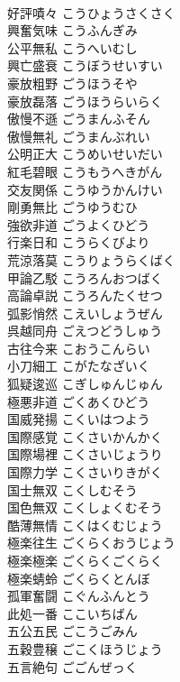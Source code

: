 \documentclass[8pt]{extreport}
\begin{document}
\begin{CJK}{UTF8}{min}
\\	好評嘖々	こうひょうさくさく	
\\	興奮気味	こうふんぎみ	
\\	公平無私	こうへいむし	
\\	興亡盛衰	こうぼうせいすい	
\\	豪放粗野	ごうほうそや	
\\	豪放磊落	ごうほうらいらく	
\\	傲慢不遜	ごうまんふそん	
\\	傲慢無礼	ごうまんぶれい	
\\	公明正大	こうめいせいだい	
\\	紅毛碧眼	こうもうへきがん	
\\	交友関係	こうゆうかんけい	
\\	剛勇無比	ごうゆうむひ	
\\	強欲非道	ごうよくひどう	
\\	行楽日和	こうらくびより	
\\	荒涼落莫	こうりょうらくばく	
\\	甲論乙駁	こうろんおつばく	
\\	高論卓説	こうろんたくせつ	
\\	弧影悄然	こえいしょうぜん	
\\	呉越同舟	ごえつどうしゅう	
\\	古往今来	こおうこんらい	
\\	小刀細工	こがたなざいく	
\\	狐疑逡巡	こぎしゅんじゅん	
\\	極悪非道	ごくあくひどう	
\\	国威発揚	こくいはつよう	
\\	国際感覚	こくさいかんかく	
\\	国際場裡	こくさいじょうり	
\\	国際力学	こくさいりきがく	
\\	国士無双	こくしむそう	
\\	国色無双	こくしょくむそう	
\\	酷薄無情	こくはくむじょう	
\\	極楽往生	ごくらくおうじょう	
\\	極楽極楽	ごくらくごくらく	
\\	極楽蜻蛉	ごくらくとんぼ	
\\	孤軍奮闘	こぐんふんとう	
\\	此処一番	ここいちばん	
\\	五公五民	ごこうごみん	
\\	五穀豊穣	ごこくほうじょう	
\\	五言絶句	ごごんぜっく	

\end{CJK}
\end{document}
